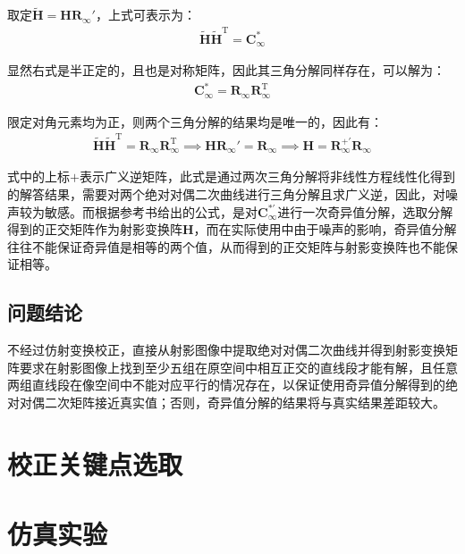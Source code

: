 \documentclass[11pt]{article}
\begin{document}
取定$\mathbf{\tilde{H}=HR_\infty'}$，上式可表示为：
\begin{align*}
  \tilde{\mathbf{{H}}}\tilde{\mathbf{H}}^\mathrm{T}=\mathbf{C_\infty^*}
\end{align*}\par
显然右式是半正定的，且也是对称矩阵，因此其三角分解同样存在，可以解为：
\begin{align*}
  \mathbf{C_\infty^*}=\mathbf{R_\infty R_\infty^\mathrm{T}}
\end{align*}\par
限定对角元素均为正，则两个三角分解的结果均是唯一的，因此有：
\begin{align}
  \tilde{\mathbf{{H}}}\tilde{\mathbf{H}}^\mathrm{T}=\mathbf{R_\infty R_\infty^\mathrm{T}}\implies\mathbf{HR_\infty'=R_\infty}\implies\mathbf{H=R_\infty^{+'}R_\infty}
  \label{eq:Cholesky}
\end{align}\par
式中的上标$+$表示广义逆矩阵，此式是通过两次三角分解将非线性方程线性化得到的解答结果，需要对两个绝对对偶二次曲线进行三角分解且求广义逆，因此，对噪声较为敏感。而根据参考书\cite{hartley2003multiple}给出的公式，是对$\mathbf{C_\infty^{*'}}$进行一次奇异值分解，选取分解得到的正交矩阵作为射影变换阵$\mathbf{H}$，而在实际使用中由于噪声的影响，奇异值分解往往不能保证奇异值是相等的两个值，从而得到的正交矩阵与射影变换阵也不能保证相等。
\subsection{问题结论}

不经过仿射变换校正，直接从射影图像中提取绝对对偶二次曲线并得到射影变换矩阵要求在射影图像上找到至少五组在原空间中相互正交的直线段才能有解，且任意两组直线段在像空间中不能对应平行的情况存在，以保证使用奇异值分解得到的绝对对偶二次矩阵接近真实值；否则，奇异值分解的结果将与真实结果差距较大。

\section{校正关键点选取}

\section{仿真实验}
\newpage
\printbibliography[heading=bibliography,title=参考文献]
\end{document}
